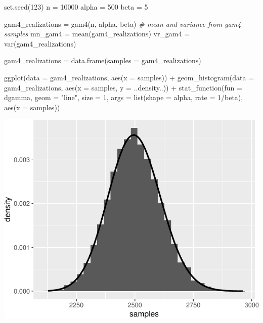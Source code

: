 \documentclass[
]{article}
\newenvironment{Shaded}{\begin{snugshade}}{\end{snugshade}}
\newcommand{\AttributeTok}[1]{\textcolor[rgb]{0.77,0.63,0.00}{#1}}
\newcommand{\CommentTok}[1]{\textcolor[rgb]{0.56,0.35,0.01}{\textit{#1}}}
\newcommand{\DecValTok}[1]{\textcolor[rgb]{0.00,0.00,0.81}{#1}}
\newcommand{\FunctionTok}[1]{\textcolor[rgb]{0.00,0.00,0.00}{#1}}
\newcommand{\NormalTok}[1]{#1}
\newcommand{\OtherTok}[1]{\textcolor[rgb]{0.56,0.35,0.01}{#1}}
\newcommand{\SpecialCharTok}[1]{\textcolor[rgb]{0.00,0.00,0.00}{#1}}
\newcommand{\StringTok}[1]{\textcolor[rgb]{0.31,0.60,0.02}{#1}}
\begin{document}
\begin{Shaded}
\begin{Highlighting}[]
\FunctionTok{set.seed}\NormalTok{(}\DecValTok{123}\NormalTok{)}
\NormalTok{n }\OtherTok{=} \DecValTok{10000}
\NormalTok{alpha }\OtherTok{=} \DecValTok{500}
\NormalTok{beta }\OtherTok{=} \DecValTok{5}

\NormalTok{gam4\_realizations }\OtherTok{=} \FunctionTok{gam4}\NormalTok{(n, alpha, beta)}
\CommentTok{\# mean and variance from gam4 samples}
\NormalTok{mn\_gam4 }\OtherTok{=} \FunctionTok{mean}\NormalTok{(gam4\_realizations)}
\NormalTok{vr\_gam4 }\OtherTok{=} \FunctionTok{var}\NormalTok{(gam4\_realizations)}

\NormalTok{gam4\_realizations }\OtherTok{=} \FunctionTok{data.frame}\NormalTok{(}\AttributeTok{samples =}\NormalTok{ gam4\_realizations)}

\FunctionTok{ggplot}\NormalTok{(}\AttributeTok{data =}\NormalTok{ gam4\_realizations, }\FunctionTok{aes}\NormalTok{(}\AttributeTok{x =}\NormalTok{ samples)) }\SpecialCharTok{+} \FunctionTok{geom\_histogram}\NormalTok{(}\AttributeTok{data =}\NormalTok{ gam4\_realizations, }
    \FunctionTok{aes}\NormalTok{(}\AttributeTok{x =}\NormalTok{ samples, }\AttributeTok{y =}\NormalTok{ ..density..)) }\SpecialCharTok{+} \FunctionTok{stat\_function}\NormalTok{(}\AttributeTok{fun =}\NormalTok{ dgamma, }\AttributeTok{geom =} \StringTok{"line"}\NormalTok{, }
    \AttributeTok{size =} \DecValTok{1}\NormalTok{, }\AttributeTok{args =} \FunctionTok{list}\NormalTok{(}\AttributeTok{shape =}\NormalTok{ alpha, }\AttributeTok{rate =} \DecValTok{1}\SpecialCharTok{/}\NormalTok{beta), }\FunctionTok{aes}\NormalTok{(}\AttributeTok{x =}\NormalTok{ samples))}
\end{Highlighting}
\end{Shaded}

\begin{center}\includegraphics{Project-1_files/figure-latex/unnamed-chunk-11-1} \end{center}
\end{document}
